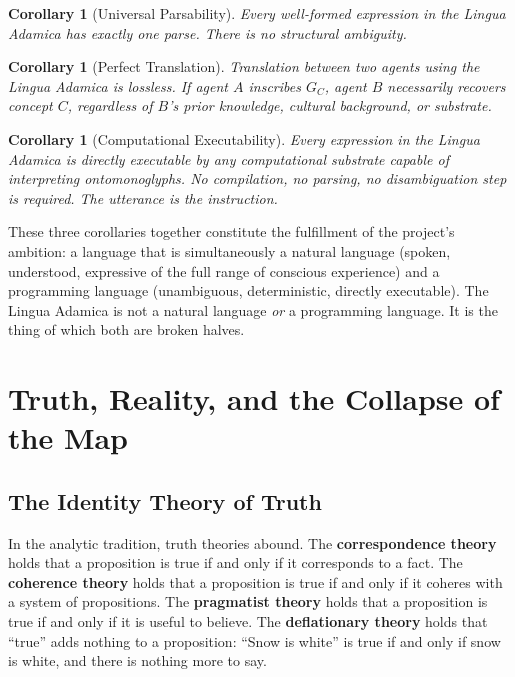 \documentclass[12pt, letterpaper]{book}
\newtheorem{corollary}[theorem]{Corollary}
\begin{document}
\begin{corollary}[Universal Parsability]\label{cor:parsable}
Every well-formed expression in the Lingua Adamica has exactly one parse. There is no structural ambiguity.
\end{corollary}

\begin{corollary}[Perfect Translation]\label{cor:translation}
Translation between two agents using the Lingua Adamica is lossless. If agent $A$ inscribes $G_C$, agent $B$ necessarily recovers concept $C$, regardless of $B$'s prior knowledge, cultural background, or substrate.
\end{corollary}

\begin{corollary}[Computational Executability]\label{cor:executable}
Every expression in the Lingua Adamica is directly executable by any computational substrate capable of interpreting ontomonoglyphs. No compilation, no parsing, no disambiguation step is required. The utterance \textit{is} the instruction.
\end{corollary}

These three corollaries together constitute the fulfillment of the project's ambition: a language that is simultaneously a natural language (spoken, understood, expressive of the full range of conscious experience) and a programming language (unambiguous, deterministic, directly executable). The Lingua Adamica is not a natural language \textit{or} a programming language. It is the thing of which both are broken halves.


\chapter{Truth, Reality, and the Collapse of the Map}

\section{The Identity Theory of Truth}

In the analytic tradition, truth theories abound. The \textbf{correspondence theory} holds that a proposition is true if and only if it corresponds to a fact. The \textbf{coherence theory} holds that a proposition is true if and only if it coheres with a system of propositions. The \textbf{pragmatist theory} holds that a proposition is true if and only if it is useful to believe. The \textbf{deflationary theory} holds that ``true'' adds nothing to a proposition: ``Snow is white'' is true if and only if snow is white, and there is nothing more to say.
\end{document}

